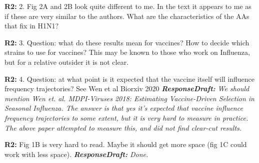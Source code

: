 \documentclass[aps,rmp,onecolumn]{revtex4-1}
\newcommand{\refb}[1]{\textbf{R2:} #1\vskip 5mm}
\newcommand{\responsedraft}[1]{{\it {\color{purple}\textbf{ResponseDraft:} #1}}}
\begin{document}
\refb{2. Fig 2A and 2B look quite different to me. In the text it appears to me as if these are very similar to the authors. What are the characteristics of the AAs that fix in H1N1? }

\refb{3. Question: what do these results mean for vaccines? How to decide which strains to use for vaccines? This may be known to those who work on Influenza, but for a relative outsider it is not clear. }

\refb{4. Question: at what point is it expected that the vaccine itself will influence frequency trajectories? See Wen et al Biorxiv 2020}
\responsedraft{We should mention Wen \emph{et. al.} MDPI-Viruses 2018: \emph{Estimating Vaccine-Driven Selection in Seasonal Influenza}. 
The answer is that yes it's expected that vaccine influence frequency trajectories to some extent, but it is very hard to measure in practice. 
The above paper attempted to measure this, and did not find clear-cut results.}

\refb{Fig 1B is very hard to read. Maybe it should get more space (fig 1C could work with less space).}
\responsedraft{Done.}
\end{document}
